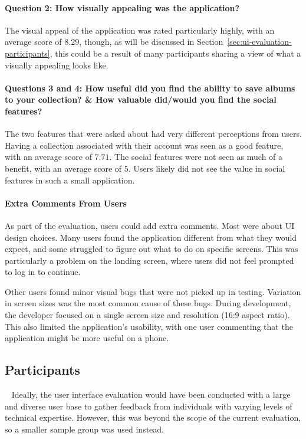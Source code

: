 \paragraph{Question 2: How visually appealing was the application?}
The visual appeal of the application was rated particularly highly, with an average score of $8.29$, though, as will be discussed in Section~\ref{sec:ui-evaluation-participants}, this could be a result of many participants sharing a view of what a visually appealing looks like.

\paragraph{Questions 3 and 4: How useful did you find the ability to save albums to your collection? \& How valuable did/would you find the social features?}
The two features that were asked about had very different perceptions from users. Having a collection associated with their account was seen as a good feature, with an average score of $7.71$. The social features were not seen as much of a benefit, with an average score of $5$. Users likely did not see the value in social features in such a small application.

\paragraph{Extra Comments From Users}
As part of the evaluation, users could add extra comments. Most were about UI design choices. Many users found the application different from what they would expect, and some struggled to figure out what to do on specific screens. This was particularly a problem on the landing screen, where users did not feel prompted to log in to continue.

Other users found minor visual bugs that were not picked up in testing. Variation in screen sizes was the most common cause of these bugs. During development, the developer focused on a single screen size and resolution (16:9 aspect ratio). This also limited the application's usability, with one user commenting that the application might be more useful on a phone.

\subsection{Participants}~\label{sec:ui-evaluation-participants}
Ideally, the user interface evaluation would have been conducted with a large and diverse user base to gather feedback from individuals with varying levels of technical expertise. However, this was beyond the scope of the current evaluation, so a smaller sample group was used instead.

